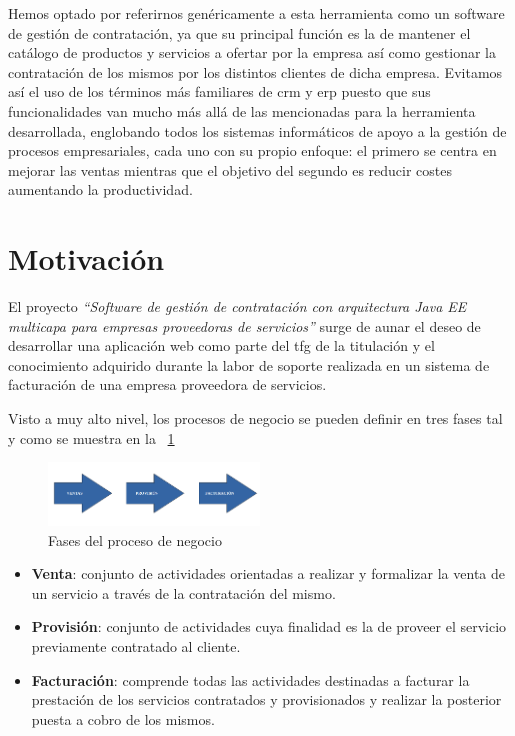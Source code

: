 Hemos optado por referirnos genéricamente a esta herramienta como un software de gestión de contratación, ya que su principal función es la de mantener el catálogo de productos y servicios a ofertar por la empresa así como gestionar la contratación de los mismos por los distintos clientes de dicha empresa. Evitamos así el uso de los términos más familiares de \acrfull{crm} y \acrfull{erp} puesto que sus funcionalidades van mucho más allá de las mencionadas para la herramienta desarrollada, englobando todos los sistemas informáticos de apoyo a la gestión de procesos empresariales, cada uno con su propio enfoque: el primero se centra en mejorar las ventas mientras que el objetivo del segundo es reducir costes aumentando la productividad.


\section{Motivación}
\label{sec:motivacion}

El proyecto \emph{``Software de gestión de contratación con arquitectura Java EE multicapa para empresas proveedoras de servicios''} surge de aunar el deseo de desarrollar una aplicación web como parte del \acrshort{tfg} de la titulación y el conocimiento adquirido durante la labor de soporte realizada en un sistema de facturación de una empresa proveedora de servicios.

Visto a muy alto nivel, los procesos de negocio se pueden definir en tres fases tal y como se muestra en la \figurename~\ref{fig:fases-proceso-negocio} 

\begin{figure}[hp!]
  \centering
  \includegraphics[width=0.50\textwidth]{imaxes/fases-proceso-negocio.png}
  \caption{Fases del proceso de negocio}
  \label{fig:fases-proceso-negocio}
\end{figure}

\begin{itemize}
\item \textbf{Venta}: conjunto de actividades orientadas a realizar y formalizar la venta de un servicio a través de la contratación del mismo.
\item \textbf{Provisión}: conjunto de actividades cuya finalidad es la de proveer el servicio previamente contratado al cliente.
\item \textbf{Facturación}: comprende todas las actividades destinadas a facturar la prestación de los servicios contratados y provisionados y realizar la posterior puesta a cobro de los mismos.
\end{itemize}

